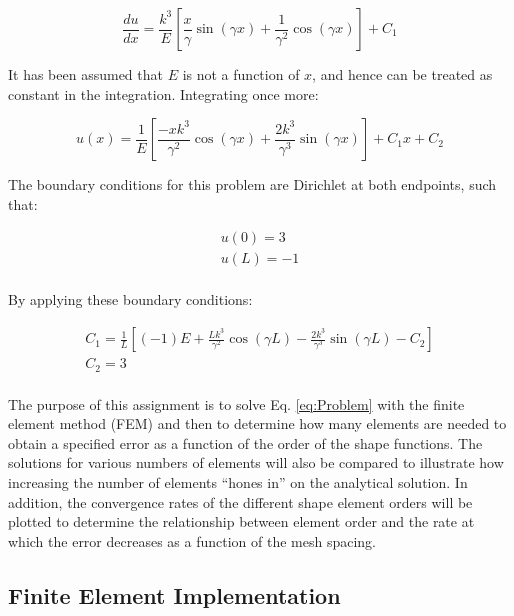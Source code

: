 \documentclass[10pt]{article}
\begin{document}
\begin{equation}
\label{eq:Problem2}
\frac{du}{dx}=\frac{k^3}{E}\left\lbrack \frac{x}{\gamma}\sin{(\gamma x)}+\frac{1}{\gamma^2}\cos{(\gamma x)}\right\rbrack+C_1
\end{equation}

It has been assumed that \(E\) is not a function of \(x\), and hence can be treated as constant in the integration. Integrating once more:

\begin{equation}
\label{eq:Problem3}
u(x)=\frac{1}{E}\left\lbrack\frac{-xk^3}{\gamma^2}\cos{(\gamma x)}+\frac{2k^3}{\gamma^3}\sin{(\gamma x)}\right\rbrack+C_1x+C_2
\end{equation}

The boundary conditions for this problem are Dirichlet at both endpoints, such that:

\begin{equation}
\begin{aligned}
u(0)=3\\
u(L)=-1\\
\end{aligned}
\end{equation}

By applying these boundary conditions:

\begin{equation}
\label{eq:BC}
\begin{aligned}
C_1=\frac{1}{L}\left\lbrack(-1)E+\frac{Lk^3}{\gamma^2}\cos{(\gamma L)}-\frac{2k^3}{\gamma^3}\sin{(\gamma L)}-C_2\right\rbrack\\
C_2=3\\
\end{aligned}
\end{equation}

The purpose of this assignment is to solve Eq. \eqref{eq:Problem} with the finite element method (FEM) and then to determine how many elements are needed to obtain a specified error as a function of the order of the shape functions. The solutions for various numbers of elements will also be compared to illustrate how increasing the number of elements ``hones in'' on the analytical solution. In addition, the convergence rates of the different shape element orders will be plotted to determine the relationship between element order and the rate at which the error decreases as a function of the mesh spacing.

\subsection{Finite Element Implementation}
\end{document}
